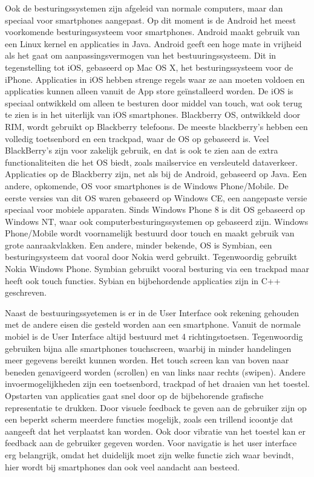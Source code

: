 Ook de besturingssystemen zijn afgeleid van normale computers, maar dan speciaal voor smartphones aangepast. Op dit moment is de Android het meest voorkomende besturingssysteem voor smartphones. Android maakt gebruik van een Linux kernel en applicaties in Java. Android geeft een hoge mate in vrijheid als het gaat om aanpassingsvermogen van het bestuuringssysteem. Dit in tegenstelling tot iOS, gebaseerd op Mac OS X, het besturingssysteem voor de iPhone. Applicaties in iOS hebben strenge regels waar ze aan moeten voldoen en applicaties kunnen alleen vanuit de App store geïnstalleerd worden. De iOS is speciaal ontwikkeld om alleen te besturen door middel van touch, wat ook terug te zien is in het uiterlijk van iOS smartphones. Blackberry OS, ontwikkeld door RIM, wordt gebruikt op Blackberry telefoons. De meeste blackberry's hebben een volledig toetsenbord en een trackpad, waar de OS op gebaseerd is. Veel BlackBerry's zijn voor zakelijk gebruik, en dat is ook te zien aan de extra functionaliteiten die het OS biedt, zoals mailservice en versleuteld dataverkeer. Applicaties op de Blackberry zijn, net als bij de Android, gebaseerd op Java. Een andere, opkomende, OS voor smartphones is de Windows Phone/Mobile. De eerste versies van dit OS waren gebaseerd op Windows CE, een aangepaste versie speciaal voor mobiele apparaten. Sinds Windows Phone 8 is dit OS gebaseerd op Windows NT, waar ook computerbesturingssystemen op gebaseerd zijn. Windows Phone/Mobile wordt voornamelijk bestuurd door touch en maakt gebruik van grote aanraakvlakken. Een andere, minder bekende, OS is Symbian, een besturingsysteem dat vooral door Nokia werd gebruikt. Tegenwoordig gebruikt Nokia Windows Phone. Symbian gebruikt vooral besturing via een trackpad maar heeft ook touch functies. Sybian en bijbehordende applicaties zijn in C++ geschreven.

Naast de bestuuringssyetemen is er in de User Interface ook rekening gehouden met de andere eisen die gesteld worden aan een smartphone. Vanuit de normale mobiel is de User Interface altijd bestuurd met 4 richtingstoetsen. Tegenwoordig gebruiken bijna alle smartphones touchscreen, waarbij in minder handelingen meer gegevens bereikt kunnen worden. Het touch screen kan van boven naar beneden genavigeerd worden (scrollen) en van links naar rechts (swipen). Andere invoermogelijkheden zijn een toetsenbord, trackpad of het draaien van het toestel. Opstarten van applicaties gaat snel door op de bijbehorende grafische representatie te drukken. Door visuele feedback te geven aan de gebruiker zijn op een beperkt scherm meerdere functies mogelijk, zoals een trillend icoontje dat aangeeft dat het verplaatst kan worden. Ook door vibratie van het toestel kan er feedback aan de gebruiker gegeven worden. Voor navigatie is het user interface erg belangrijk, omdat het duidelijk moet zijn welke functie zich waar bevindt, hier wordt bij smartphones dan ook veel aandacht aan besteed. 

